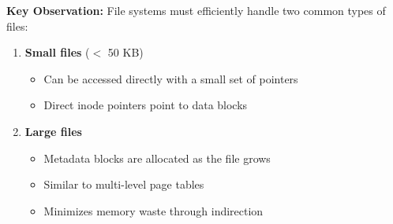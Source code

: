\documentclass[../../compsys.tex]{subfiles}
\begin{document}
\noindent
\begin{minipage}{0.55\textwidth}
  \textbf{Key Observation:} File systems must efficiently handle two common types of files:
  
  \begin{enumerate}
    \item \textbf{Small files} ($<$ 50 KB)
      \begin{itemize}
        \item Can be accessed directly with a small set of pointers
        \item Direct inode pointers point to data blocks
      \end{itemize}
    
    \item \textbf{Large files}
      \begin{itemize}
        \item Metadata blocks are allocated as the file grows
        \item Similar to multi-level page tables
        \item Minimizes memory waste through indirection
      \end{itemize}
  \end{enumerate}
\end{minipage}
\hfill
\vline
\hfill
\end{document}
